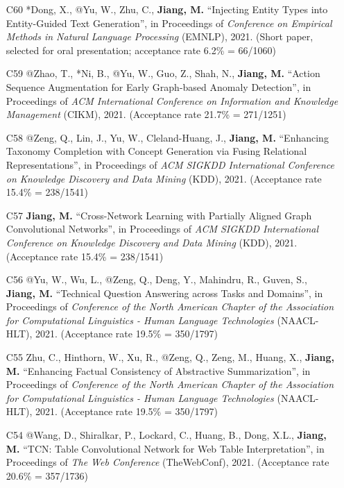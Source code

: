 \documentclass[10pt]{article}
\newenvironment{myindentpar}[1]%
{\begin{list}{}%
         {\setlength{\leftmargin}{#1}}%
         \item[]%
}
{\end{list}}
\newcounter{list}
\begin{document}
\begin{myindentpar}{0.00cm}
\begin{enumerate}[leftmargin=.5cm]
\item[C60] *Dong, X., @Yu, W., Zhu, C., \textbf{Jiang, M.} ``Injecting Entity Types into Entity-Guided Text Generation'', in Proceedings of \textit{Conference on Empirical Methods in Natural Language Processing} (EMNLP), 2021. (Short paper, selected for oral presentation; acceptance rate 6.2\% = 66/1060)

\item[C59] @Zhao, T., *Ni, B., @Yu, W., Guo, Z., Shah, N., \textbf{Jiang, M.} ``Action Sequence Augmentation for Early Graph-based Anomaly Detection'', in Proceedings of \textit{ACM International Conference on Information and Knowledge Management} (CIKM), 2021. (Acceptance rate 21.7\% = 271/1251)
		
\item[C58] @Zeng, Q., Lin, J., Yu, W., Cleland-Huang, J., \textbf{Jiang, M.} ``Enhancing Taxonomy Completion with Concept Generation via Fusing Relational Representations'', in Proceedings of \textit{ACM SIGKDD International Conference on Knowledge Discovery and Data Mining} (KDD), 2021. (Acceptance rate 15.4\% = 238/1541)

\item[C57] \textbf{Jiang, M.} ``Cross-Network Learning with Partially Aligned Graph Convolutional Networks'', in Proceedings of \textit{ACM SIGKDD International Conference on Knowledge Discovery and Data Mining} (KDD), 2021. (Acceptance rate 15.4\% = 238/1541)	

\item[C56] @Yu, W., Wu, L., @Zeng, Q., Deng, Y., Mahindru, R., Guven, S., \textbf{Jiang, M.} ``Technical Question Answering across Tasks and Domains'', in Proceedings of \textit{Conference of the North American Chapter of the Association for Computational Linguistics - Human Language Technologies} (NAACL-HLT), 2021. (Acceptance rate 19.5\% = 350/1797)

\item[C55] Zhu, C., Hinthorn, W., Xu, R., @Zeng, Q., Zeng, M., Huang, X., \textbf{Jiang, M.} ``Enhancing Factual Consistency of Abstractive Summarization'', in Proceedings of \textit{Conference of the North American Chapter of the Association for Computational Linguistics - Human Language Technologies} (NAACL-HLT), 2021. (Acceptance rate 19.5\% = 350/1797)

\item[C54] @Wang, D., Shiralkar, P., Lockard, C., Huang, B., Dong, X.L., \textbf{Jiang, M.} ``TCN: Table Convolutional Network for Web Table Interpretation'', in Proceedings of \textit{The Web Conference} (TheWebConf), 2021. (Acceptance rate 20.6\% = 357/1736)


\end{enumerate}
\end{myindentpar}
\end{document}
